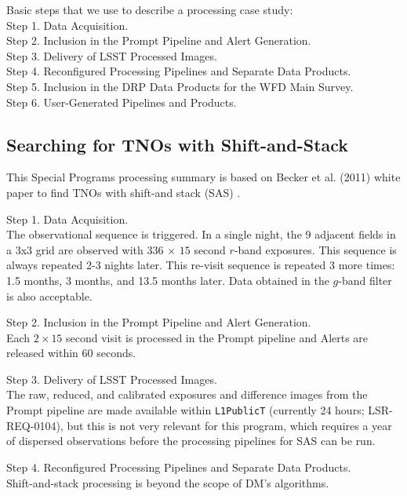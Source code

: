 \documentclass[DM,lsstdoc,toc]{lsstdoc}
\begin{document}
Basic steps that we use to describe a processing case study: \\
Step 1. Data Acquisition. \\
Step 2. Inclusion in the Prompt Pipeline and Alert Generation. \\
Step 3. Delivery of LSST Processed Images. \\
Step 4. Reconfigured Processing Pipelines and Separate Data Products. \\
Step 5. Inclusion in the DRP Data Products for the WFD Main Survey. \\
Step 6. User-Generated Pipelines and Products. \\


\subsection{Searching for TNOs with Shift-and-Stack}\label{ssec:SPCS_TNO}

This Special Programs processing summary is based on Becker et al. (2011) white paper to find TNOs with shift-and stack (SAS) .

Step 1. Data Acquisition. \\
The observational sequence is triggered. In a single night, the 9 adjacent fields in a 3x3 grid are observed with $336$ $\times$ $15$ second $r$-band exposures. This sequence is always repeated 2-3 nights later. This re-visit sequence is repeated 3 more times: 1.5 months, 3 months, and 13.5 months later. Data obtained in the $g$-band filter is also acceptable. 

Step 2. Inclusion in the Prompt Pipeline and Alert Generation. \\
Each $2\times15$ second visit is processed in the Prompt pipeline and Alerts are released within 60 seconds.

Step 3. Delivery of LSST Processed Images. \\
The raw, reduced, and calibrated exposures and difference images from the Prompt pipeline are made available within \texttt{L1PublicT} (currently 24 hours; LSR-REQ-0104), but this is not very relevant for this program, which requires a year of dispersed observations before the processing pipelines for SAS can be run.

Step 4. Reconfigured Processing Pipelines and Separate Data Products. \\
Shift-and-stack processing is beyond the scope of DM's algorithms.
\end{document}
